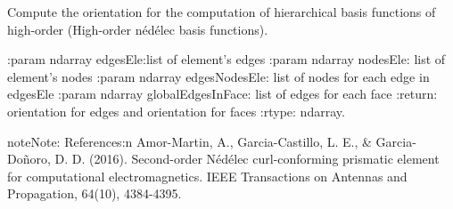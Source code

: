 \documentclass[letterpaper,10pt,english]{sphinxmanual}
\begin{document}
\begin{fulllineitems}
\label{\detokenize{petgem/hvfem:petgem.hvfem.computeElementOrientation}}
Compute the orientation for the computation of hierarchical basis functions of high-order (High-order nédélec basis functions).

:param ndarray edgesEle:list of element’s edges
:param ndarray nodesEle: list of element’s nodes
:param ndarray edgesNodesEle: list of nodes for each edge in edgesEle
:param ndarray globalEdgesInFace: list of edges for each face
:return: orientation for edges and orientation for faces
:rtype: ndarray.

\begin{sphinxadmonition}{note}{Note:}
References:n
Amor-Martin, A., Garcia-Castillo, L. E., \& Garcia-Doñoro, D. D.
(2016). Second-order Nédélec curl-conforming prismatic element
for computational electromagnetics. IEEE Transactions on
Antennas and Propagation, 64(10), 4384-4395.
\end{sphinxadmonition}

\end{fulllineitems}

\end{document}
